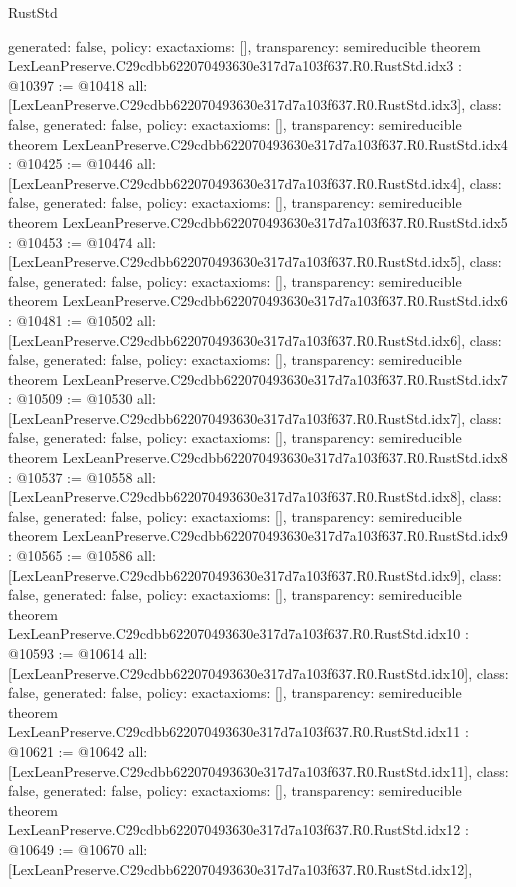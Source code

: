 \begin{lexlean}{RustStd}
\begin{coremodule}
{  generated: false,
  policy: exact{axioms: []},
  transparency: semireducible
}
theorem LexLeanPreserve.C29cdbb622070493630e317d7a103f637.R0.RustStd.idx3 : @10397 := @10418 {
  all: [LexLeanPreserve.C29cdbb622070493630e317d7a103f637.R0.RustStd.idx3],
  class: false,
  generated: false,
  policy: exact{axioms: []},
  transparency: semireducible
}
theorem LexLeanPreserve.C29cdbb622070493630e317d7a103f637.R0.RustStd.idx4 : @10425 := @10446 {
  all: [LexLeanPreserve.C29cdbb622070493630e317d7a103f637.R0.RustStd.idx4],
  class: false,
  generated: false,
  policy: exact{axioms: []},
  transparency: semireducible
}
theorem LexLeanPreserve.C29cdbb622070493630e317d7a103f637.R0.RustStd.idx5 : @10453 := @10474 {
  all: [LexLeanPreserve.C29cdbb622070493630e317d7a103f637.R0.RustStd.idx5],
  class: false,
  generated: false,
  policy: exact{axioms: []},
  transparency: semireducible
}
theorem LexLeanPreserve.C29cdbb622070493630e317d7a103f637.R0.RustStd.idx6 : @10481 := @10502 {
  all: [LexLeanPreserve.C29cdbb622070493630e317d7a103f637.R0.RustStd.idx6],
  class: false,
  generated: false,
  policy: exact{axioms: []},
  transparency: semireducible
}
theorem LexLeanPreserve.C29cdbb622070493630e317d7a103f637.R0.RustStd.idx7 : @10509 := @10530 {
  all: [LexLeanPreserve.C29cdbb622070493630e317d7a103f637.R0.RustStd.idx7],
  class: false,
  generated: false,
  policy: exact{axioms: []},
  transparency: semireducible
}
theorem LexLeanPreserve.C29cdbb622070493630e317d7a103f637.R0.RustStd.idx8 : @10537 := @10558 {
  all: [LexLeanPreserve.C29cdbb622070493630e317d7a103f637.R0.RustStd.idx8],
  class: false,
  generated: false,
  policy: exact{axioms: []},
  transparency: semireducible
}
theorem LexLeanPreserve.C29cdbb622070493630e317d7a103f637.R0.RustStd.idx9 : @10565 := @10586 {
  all: [LexLeanPreserve.C29cdbb622070493630e317d7a103f637.R0.RustStd.idx9],
  class: false,
  generated: false,
  policy: exact{axioms: []},
  transparency: semireducible
}
theorem LexLeanPreserve.C29cdbb622070493630e317d7a103f637.R0.RustStd.idx10 : @10593 := @10614 {
  all: [LexLeanPreserve.C29cdbb622070493630e317d7a103f637.R0.RustStd.idx10],
  class: false,
  generated: false,
  policy: exact{axioms: []},
  transparency: semireducible
}
theorem LexLeanPreserve.C29cdbb622070493630e317d7a103f637.R0.RustStd.idx11 : @10621 := @10642 {
  all: [LexLeanPreserve.C29cdbb622070493630e317d7a103f637.R0.RustStd.idx11],
  class: false,
  generated: false,
  policy: exact{axioms: []},
  transparency: semireducible
}
theorem LexLeanPreserve.C29cdbb622070493630e317d7a103f637.R0.RustStd.idx12 : @10649 := @10670 {
  all: [LexLeanPreserve.C29cdbb622070493630e317d7a103f637.R0.RustStd.idx12],
}
\end{coremodule}
\end{lexlean}
